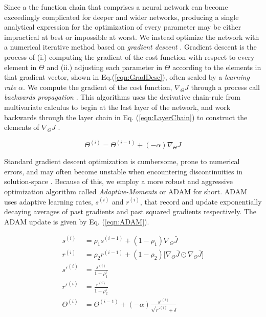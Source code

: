 \documentclass[conference,onecolumn,letterpaper]{IEEEtran}
\begin{document}
Since a the function chain that comprises a neural network can become exceedingly complicated for deeper and wider networks, producing a single analytical expression for the optimization of every parameter may be either impractical at best or impossible at worst. We instead optimize the network with a numerical iterative method based on \textit{gradient descent} \cite{Geron,Goodfellow}. Gradient descent is the process of (i.) computing the gradient of the cost function with respect to every element in $\Theta$ and (ii.) adjusting each parameter in $\Theta$ according to the elements in that gradient vector, shown in Eq.(\ref{eqn:GradDesc}), often scaled by a \textit{learning rate} $\alpha$. We compute the gradient of the cost function, $\nabla_{\Theta}J$ through a process call \textit{backwards propagation} \cite{Geron}. This algorithms uses the derivative chain-rule from multivariate calculus to begin at the last layer of the network, and work backwards through the layer chain in Eq. (\ref{eqn:LayerChain}) to construct the elements of $\nabla_{\Theta}J$ \cite{Goodfellow,Virtanen}.

\begin{equation}
    \label{eqn:GradDesc}
    \Theta^{(i)} = \Theta^{(i-1)} + (-\alpha)\nabla_{\Theta}J
\end{equation}

Standard gradient descent optimization is cumbersome, prone to numerical errors, and may often become unstable when encountering discontinuities in solution-space \cite{James,Geron}. Because of this, we employ a more robust and aggressive optimization algorithm called \textit{Adaptive-Moments} or ADAM for short. ADAM uses adaptive learning rates, $s^{(i)}$ and $r^{(i)}$, that record and update exponentially decaying averages of past gradients and past squared gradients respectively. The ADAM update is given by Eq. (\ref{eqn:ADAM}).

\begin{equation}
    \label{eqn:ADAM}
        \begin{split}
        s^{(i)} &= \rho_1 s^{(i-1)} + (1 - \rho_1) \nabla_{\Theta} \bar{J}  \\
        r^{(i)} &= \rho_2 r^{(i-1)} + (1 - \rho_2) \Big[ \nabla_{\Theta} \bar{J} \odot \nabla_{\Theta} \bar{J} \Big]  \\
        s'^{(i)} &= \frac{s^{(i)}}{1-\rho_1^i} \\
        r'^{(i)} &= \frac{r^{(i)}}{1-\rho_2^i} \\
        \Theta^{(i)} &= \Theta^{(i-1)} + (-\alpha)\frac{s'^{(i)}}{\sqrt{r'^{(i)}}+\delta} \\
        \end{split}
\end{equation}
\end{document}
